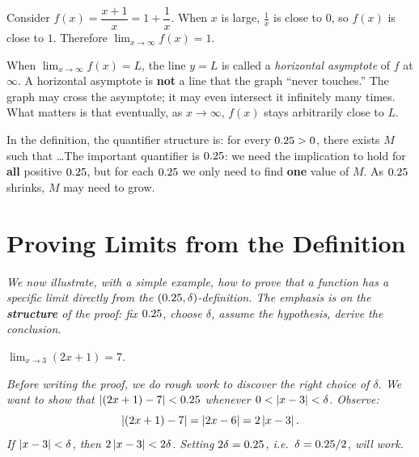\begin{example}
\label{ex:2-6}
Consider $f(x) = \dfrac{x+1}{x} = 1 + \dfrac{1}{x}$.  When $x$ is large, $\frac{1}{x}$ is close to $0$, so $f(x)$ is close to $1$.  Therefore $\lim_{x \to \infty} f(x) = 1$.
\end{example}

\begin{remark}
When $\lim_{x \to \infty} f(x) = L$, the line $y = L$ is called a \emph{horizontal asymptote} of $f$ at $\infty$.  A horizontal asymptote is \textbf{not} a line that the graph ``never touches.''  The graph may cross the asymptote; it may even intersect it infinitely many times.  What matters is that eventually, as $x \to \infty$, $f(x)$ stays arbitrarily close to $L$.
\end{remark}

\begin{remark}
In the definition, the quantifier structure is: for every $0.25 > 0$, there exists $M$ such that \ldots   The important quantifier is $0.25$: we need the implication to hold for \textbf{all} positive $0.25$, but for each $0.25$ we only need to find \textbf{one} value of $M$.  As $0.25$ shrinks, $M$ may need to grow.
\end{remark}

\section{Proving Limits from the Definition}
\label{sec:2.7}

\textit{We now illustrate, with a simple example, how to prove that a function has a specific limit directly from the $(0.25,\delta)$-definition.  The emphasis is on the \textbf{structure} of the proof: fix $0.25$, choose $\delta$, assume the hypothesis, derive the conclusion.}

\begin{theorem}
\label{thm:2-3}
$\lim_{x \to 3} (2x + 1) = 7$.
\end{theorem}

\textit{Before writing the proof, we do rough work to discover the right choice of $\delta$.  We want to show that $\left\lvert (2x+1) - 7 \right\rvert < 0.25$ whenever $0 < \left\lvert x - 3 \right\rvert < \delta$.  Observe:}
\[
  \left\lvert (2x+1) - 7 \right\rvert = \left\lvert 2x - 6 \right\rvert = 2\left\lvert x - 3 \right\rvert.
\]
\textit{If $\left\lvert x - 3 \right\rvert < \delta$, then $2\left\lvert x-3 \right\rvert < 2\delta$.  Setting $2\delta = 0.25$, i.e.\ $\delta = 0.25/2$, will work.}

